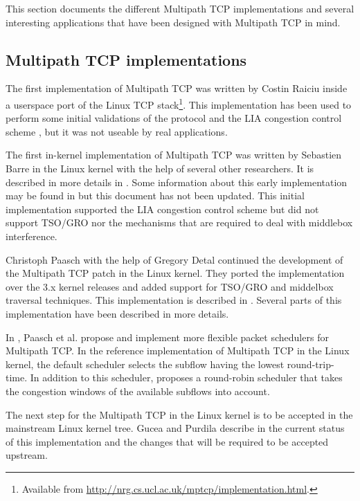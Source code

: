 This section documents the different Multipath TCP implementations \cite{draft-eardley-mptcp-implementations-survey} and several interesting applications that have been designed with Multipath TCP in mind.

\subsection{Multipath TCP implementations}

The first implementation of Multipath TCP was written by Costin Raiciu inside a userspace port of the Linux TCP stack\footnote{Available from \url{http://nrg.cs.ucl.ac.uk/mptcp/implementation.html}.}. This implementation has been used to perform some initial validations of the protocol and the LIA congestion control scheme \cite{Wischik_Design:2011}, but it was not useable by real applications.

The first in-kernel implementation of Multipath TCP was written by Sebastien Barre in the Linux kernel with the help of several other researchers. It is described in more details in \cite{Barre_thesis:2011}. Some information about this early implementation may be found in \cite{draft-barre-mptcp-impl} but this document has not been updated. This initial implementation supported the LIA congestion control scheme but did not support TSO/GRO nor the mechanisms that are required to deal with middlebox 
interference.

Christoph Paasch with the help of Gregory Detal continued the development of the Multipath TCP patch in the Linux kernel. They ported the implementation over the 3.x kernel releases and added support for TSO/GRO and middelbox traversal techniques. This implementation is described in \cite{Paasch_Thesis:2014}. Several parts of this implementation have been described in more details.

In \cite{Paasch_schedulers:2014}, Paasch et al. propose and implement more flexible packet schedulers for Multipath TCP. In the reference implementation of Multipath TCP in the Linux kernel, the default scheduler selects the subflow having the lowest round-trip-time. In addition to this scheduler, \cite{Paasch_schedulers:2014} proposes a round-robin scheduler that takes the congestion windows of the available subflows into account.

The next step for the Multipath TCP in the Linux kernel is to be accepted in the mainstream Linux kernel tree. Gucea and Purdila describe in \cite{Gucea_Shaping:2015} the current status of this implementation and the changes that will be required to be accepted upstream.

